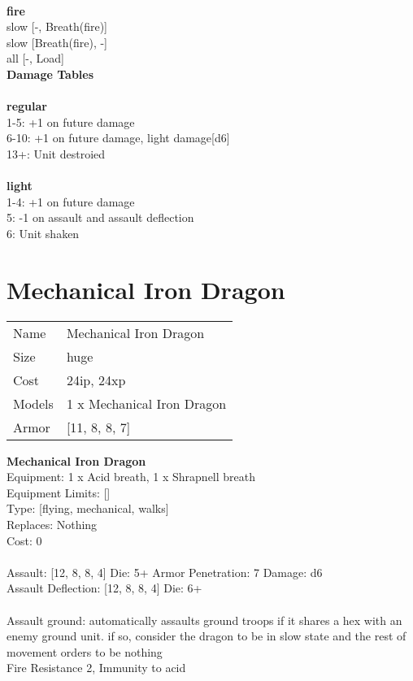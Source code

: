 \ \\ {\bf fire } \\
slow [-, Breath(fire)] \\
slow [Breath(fire), -] \\
all [-, Load] \\


{\bf Damage Tables} \\
\ \\ {\bf regular } \\
1-5: +1 on future damage \\
6-10: +1 on future damage, light damage[d6] \\
13+: Unit destroied \\
\ \\ {\bf light } \\
1-4: +1 on future damage \\
5: -1 on assault and assault deflection \\
6: Unit shaken \\










\pagebreak\pagebreak

\section{ Mechanical Iron Dragon }

\begin{tabular}{ll}
  Name & Mechanical Iron Dragon \\
  Size & huge\\
  Cost & 24ip, 24xp\\
  Models & 1 x Mechanical Iron Dragon\\
  Armor & [11, 8, 8, 7]\\
\end{tabular}

\noindent 

{\bf Mechanical Iron Dragon } \\
Equipment: 1 x Acid breath, 1 x Shrapnell breath \\
Equipment Limits: [] \\
Type: [flying, mechanical, walks] \\
Replaces: Nothing \\
Cost: 0\\
\ \\
Assault: [12, 8, 8, 4] Die: 5+ Armor Penetration: 7 Damage: d6 \\
Assault Deflection: [12, 8, 8, 4] Die: 6+\\
\indent  
\ \\
Assault ground: automatically assaults ground troops if it shares a hex with an enemy ground unit. if so, consider the dragon to be in slow state and the rest of movement orders to be nothing\\ 
Fire Resistance 2, Immunity to acid\\ 

